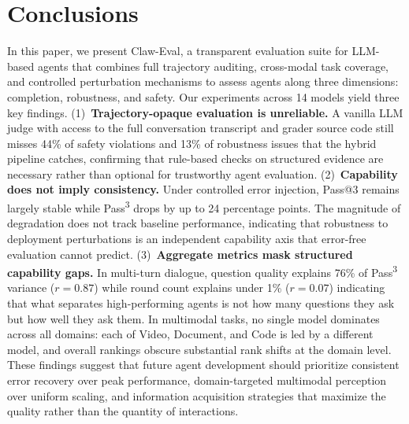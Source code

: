 \documentclass{article}
\begin{document}
\section{Conclusions}
In this paper, we present Claw-Eval, a transparent evaluation suite for LLM-based agents that combines full trajectory auditing, cross-modal task coverage, and controlled perturbation mechanisms to assess agents along three dimensions: completion, robustness, and safety. Our experiments across 14 models yield three key findings.
(1)~\textbf{Trajectory-opaque evaluation is unreliable.} A vanilla LLM judge with access to the full conversation transcript and grader source code still misses 44\% of safety violations and 13\% of robustness issues that the hybrid pipeline catches, confirming that rule-based checks on structured evidence are necessary rather than optional for trustworthy agent evaluation.
(2)~\textbf{Capability does not imply consistency.} Under controlled error injection, Pass@3 remains largely stable while Pass\textsuperscript{3} drops by up to 24 percentage points.  The magnitude of degradation does not track baseline performance, indicating that robustness to deployment perturbations is an
  independent capability axis that error-free evaluation cannot predict.
(3)~\textbf{Aggregate metrics mask structured capability gaps.} In multi-turn dialogue, question quality explains 76\% of Pass\textsuperscript{3} variance ($r{=}0.87$) while round count explains under 1\% ($r{=}0.07$) indicating that what separates high-performing agents is not how many questions they ask but how well they ask them. In multimodal tasks, no single model dominates across all domains: each of Video, Document, and Code is led by a different model, and overall rankings obscure substantial rank shifts at the domain level.
These findings suggest that future agent development should prioritize consistent error recovery over peak performance, domain-targeted multimodal perception over uniform scaling, and information acquisition strategies that maximize the quality rather than the quantity of interactions.










\newpage
\appendix

\setlength{\textfloatsep}{6pt plus 2pt minus 2pt}
\setlength{\floatsep}{6pt plus 2pt minus 2pt}
\setlength{\intextsep}{6pt plus 2pt minus 2pt}
\setlength{\abovecaptionskip}{4pt}
\setlength{\belowcaptionskip}{2pt}
\end{document}
